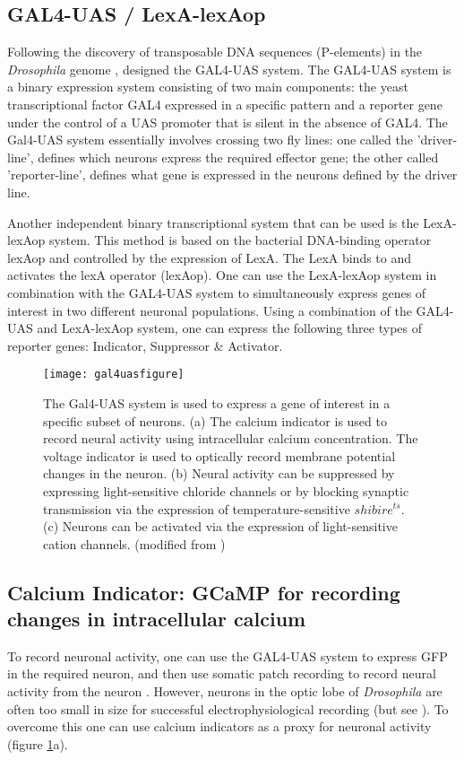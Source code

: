 \subsection{GAL4-UAS / LexA-lexAop}
Following the discovery of transposable DNA sequences (P-elements) in the \textit{Drosophila} genome \parencite{Rubin1982}, \cite{Brand1993} designed the GAL4-UAS system. The GAL4-UAS system is a binary expression system consisting of two main components: the yeast transcriptional factor GAL4 expressed in a specific pattern and a reporter gene under the control of a UAS promoter that is silent in the absence of GAL4. The Gal4-UAS system essentially involves crossing two fly lines: one called the 'driver-line', defines which neurons express the required effector gene; the other called 'reporter-line', defines what gene is expressed in the neurons defined by the driver line. 

Another independent binary transcriptional system that can be used is the LexA-lexAop system. This method is based on the bacterial DNA-binding operator lexAop and controlled by the expression of LexA. The LexA binds to and activates the lexA operator (lexAop). One can use the LexA-lexAop system in combination with the GAL4-UAS system to simultaneously express genes of interest in two different neuronal populations. Using a combination of the GAL4-UAS and LexA-lexAop system, one can express the following three types of reporter genes: Indicator, Suppressor \& Activator.
\begin{figure}
\centering
\hspace*{-1cm} 
\texttt{[image: gal4uasfigure]}
\caption[Genetic tools for functional manipulations in \textit{Drosophila}] {The Gal4-UAS system is used to express a gene of interest in a specific subset of neurons. (a) The calcium indicator is used to record neural activity using intracellular calcium concentration. The voltage indicator is used to optically record membrane potential changes in the neuron. (b) Neural activity can be suppressed by expressing light-sensitive chloride channels or by blocking synaptic transmission via the expression of temperature-sensitive $shibire^{ts}$. (c) Neurons can be activated via the expression of light-sensitive cation channels. (modified from \cite{Borst2009})}
\label{fig:gal4uas}
\end{figure}
\subsection{Calcium Indicator: GCaMP for recording changes in intracellular calcium}
To record neuronal activity, one can use the GAL4-UAS system to express GFP in the required neuron, and then use somatic patch recording to record neural activity from the neuron \parencite{Wilson2004, Joesch2008}. However, neurons in the optic lobe of \textit{Drosophila} are often too small in size for successful electrophysiological recording (but see \cite{Groschner2022}). To overcome this one can use calcium indicators as a proxy for neuronal activity (figure  \ref{fig:gal4uas}a). 

